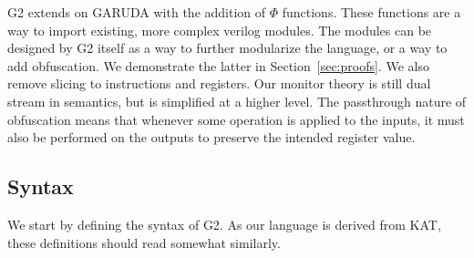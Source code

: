 \documentclass[sigconf,usenames,dvipsnames,svgnames,table]{acmart}
\def \sysname {\textsc{G2}\xspace}
\def \oldname {\textsc{GARUDA}\xspace}
\begin{document}
    \sysname extends on \oldname with the addition of $\Phi$ functions.
    These functions are a way to import existing, more complex verilog modules.
    The modules can be designed by \sysname itself as a way to further modularize the language, or a way to add obfuscation.
    We demonstrate the latter in Section~\ref{sec:proofs}.
    We also remove slicing to instructions and registers.
    Our monitor theory is still dual stream in semantics, but is simplified at a higher level.
    The passthrough nature of obfuscation means that whenever some operation is applied to the inputs, it must also be performed on the outputs to preserve the intended register value.
    \par

    \subsection{Syntax}\label{sec:spec:synt}
      We start by defining the syntax of \sysname.
      As our language is derived from KAT, these definitions should read somewhat similarly.
   
\end{document}
